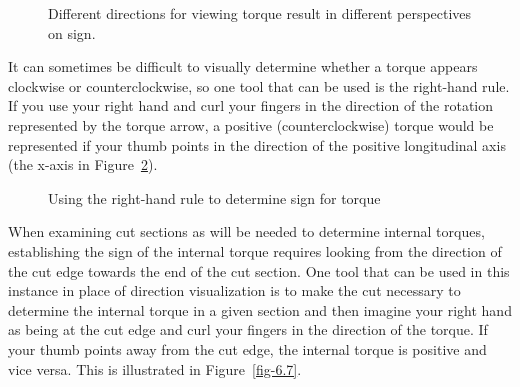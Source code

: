 \documentclass[
  letterpaper,
  DIV=11,
  numbers=noendperiod]{scrreprt}
\theoremstyle{definition}
\theoremstyle{remark}
\begin{document}
\begin{figure}


\caption{\label{fig-6.5}Different directions for viewing torque result
in different perspectives on sign.}

\end{figure}%

It can sometimes be difficult to visually determine whether a torque
appears clockwise or counterclockwise, so one tool that can be used is
the right-hand rule. If you use your right hand and curl your fingers in
the direction of the rotation represented by the torque arrow, a
positive (counterclockwise) torque would be represented if your thumb
points in the direction of the positive longitudinal axis (the x-axis in
Figure~\ref{fig-6.6}).

\begin{figure}


\caption{\label{fig-6.6}Using the right-hand rule to determine sign for
torque}

\end{figure}%

When examining cut sections as will be needed to determine internal
torques, establishing the sign of the internal torque requires looking
from the direction of the cut edge towards the end of the cut section.
One tool that can be used in this instance in place of direction
visualization is to make the cut necessary to determine the internal
torque in a given section and then imagine your right hand as being at
the cut edge and curl your fingers in the direction of the torque. If
your thumb points away from the cut edge, the internal torque is
positive and vice versa. This is illustrated in Figure~\ref{fig-6.7}.
\end{document}
